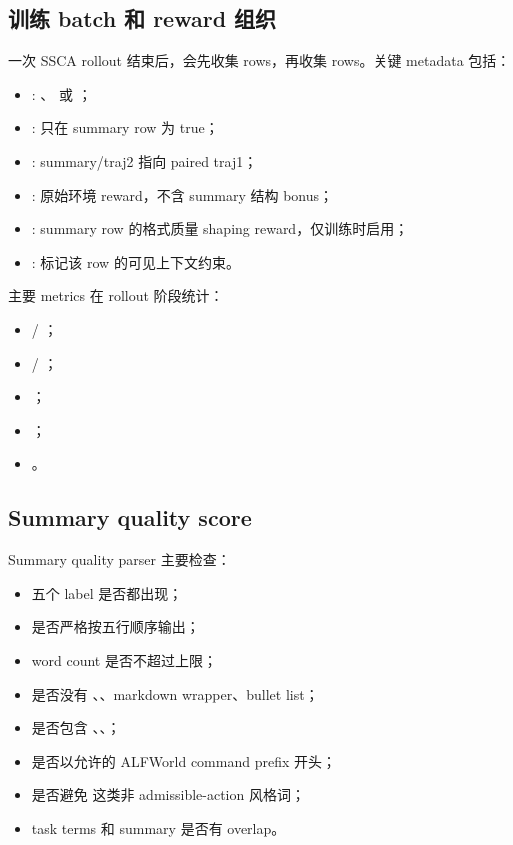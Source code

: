 \documentclass[10pt]{ctexart}
\begin{document}
\subsection{训练 batch 和 reward 组织}
一次 SSCA rollout 结束后，会先收集  rows，再收集  rows。关键 metadata 包括：
\begin{itemize}
  \item {}: 、 或 ；
  \item {}: 只在 summary row 为 true；
  \item {}: summary/traj2 指向 paired traj1；
  \item {}: 原始环境 reward，不含 summary 结构 bonus；
  \item {}: summary row 的格式质量 shaping reward，仅训练时启用；
  \item {}: 标记该 row 的可见上下文约束。
\end{itemize}

主要 metrics 在 rollout 阶段统计：
\begin{itemize}
  \item {} / ；
  \item {} / ；
  \item {}；
  \item {}；
  \item {}。
\end{itemize}

\subsection{Summary quality score}
Summary quality parser 主要检查：
\begin{itemize}
  \item 五个 label 是否都出现；
  \item 是否严格按五行顺序输出；
  \item word count 是否不超过上限；
  \item 是否没有 、、markdown wrapper、bullet list；
  \item {} 是否包含 、、；
  \item {} 是否以允许的 ALFWorld command prefix 开头；
  \item 是否避免  这类非 admissible-action 风格词；
  \item task terms 和 summary 是否有 overlap。
\end{itemize}
\end{document}
